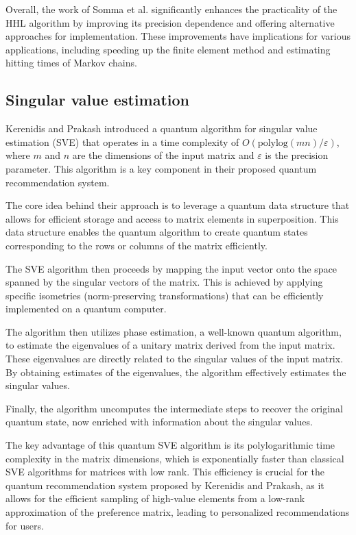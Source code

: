 \documentclass[12pt]{extarticle}
\begin{document}
Overall, the work of Somma et al. significantly enhances the practicality of the HHL algorithm by improving its precision dependence and offering alternative approaches for implementation.
These improvements have implications for various applications, including speeding up the finite element method and estimating hitting times of Markov chains.

\subsection{Singular value estimation}


Kerenidis and Prakash\cite{kerenidis2016quantum} introduced a quantum algorithm for singular value estimation (SVE) that operates in a time complexity of $O(\text{polylog}(mn)/\varepsilon)$,
where $m$ and $n$ are the dimensions of the input matrix and $\varepsilon$ is the precision parameter.
This algorithm is a key component in their proposed quantum recommendation system.

The core idea behind their approach is to leverage a quantum data structure that allows for efficient storage and access to matrix elements in superposition.
This data structure enables the quantum algorithm to create quantum states corresponding to the rows or columns of the matrix efficiently.

The SVE algorithm then proceeds by mapping the input vector onto the space spanned by the singular vectors of the matrix.
This is achieved by applying specific isometries (norm-preserving transformations) that can be efficiently implemented on a quantum computer.

The algorithm then utilizes phase estimation, a well-known quantum algorithm, to estimate the eigenvalues of a unitary matrix derived from the input matrix.
These eigenvalues are directly related to the singular values of the input matrix.
By obtaining estimates of the eigenvalues, the algorithm effectively estimates the singular values.

Finally, the algorithm uncomputes the intermediate steps to recover the original quantum state, now enriched with information about the singular values.

The key advantage of this quantum SVE algorithm is its polylogarithmic time complexity in the matrix dimensions,
which is exponentially faster than classical SVE algorithms for matrices with low rank.
This efficiency is crucial for the quantum recommendation system proposed by Kerenidis and Prakash,
as it allows for the efficient sampling of high-value elements from a low-rank approximation of the preference matrix,
leading to personalized recommendations for users.
\end{document}
